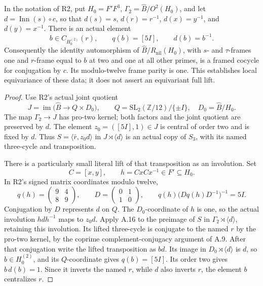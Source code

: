 In the notation of R2, put \(H_0=F'F^3\),
\(\Gamma_2=\widehat B/O^2(H_0)\), and let
\(d=\operatorname{Inn}(s)\circ c\), so that
\(d(s)=s\), \(d(r)=r^{-1}\), \(d(x)=y^{-1}\),
and \(d(y)=x^{-1}\). There is an actual element
\[
 b\in C_{H_0^{(2)}}(r),\qquad q(b)=[5I],\qquad d(b)=b^{-1}.
\]
Consequently the identity automorphism of
\(\widehat B/R_{\mathrm{nil}}(H_0)\), with \(s\)- and
\(\tau\)-frames one and \(r\)-frame equal to \(b\) at two
and one at all other primes, is a framed cocycle for
conjugation by \(c\). Its modulo-twelve frame parity is one.
This establishes local equivariance of these data; it does
not assert an equivariant full lift.

\begin{proof}
Use R2's actual joint quotient
\[
 J=\operatorname{im}\bigl(\widehat B\to Q\times D_0\bigr),
 \qquad Q=\mathrm{SL}_2(\mathbb Z/12)/\{\pm I\},\quad
 D_0=\widehat B/H_0.
\]
The map \(\Gamma_2\to J\) has pro-two kernel; both factors
and the joint quotient are preserved by \(d\).
The element \(z_0=([5I],1)\in J\) is central of order two
and is fixed by \(d\). Thus
\(S=\langle\bar r,z_0d\rangle\) in \(J\rtimes\langle d\rangle\)
is an actual copy of \(S_3\), with its named three-cycle
and transposition.

There is a particularly small literal lift of that
transposition as an involution. Set
\[
 C=[x,y],\qquad h=CxCx^{-1}\in F'\subseteq H_0.
\]
In R2's signed matrix coordinates modulo twelve,
\[
 q(h)=\begin{pmatrix}9&4\\8&9\end{pmatrix},\qquad
 D=\begin{pmatrix}0&1\\1&0\end{pmatrix},\qquad
 q(h)\bigl(Dq(h)D^{-1}\bigr)^{-1}=5I.
\]
Conjugation by \(D\) represents \(d\) on \(Q\).
The \(D_0\)-coordinate of \(h\) is one, so the actual
involution \(hdh^{-1}\) maps to \(z_0d\).
Apply A.16 to the preimage of \(S\) in
\(\Gamma_2\rtimes\langle d\rangle\), retaining this
involution. Its lifted three-cycle is conjugate to
the named \(r\) by the pro-two kernel, by the
coprime complement-conjugacy argument of A.9.
After that conjugation write the lifted transposition
as \(bd\). Its image in \(D_0\rtimes\langle d\rangle\)
is \(d\), so \(b\in H_0^{(2)}\), and its \(Q\)-coordinate
gives \(q(b)=[5I]\). Its order two gives \(b\,d(b)=1\).
Since it inverts the named \(r\), while \(d\) also
inverts \(r\), the element \(b\) centralizes \(r\).


\end{proof}
